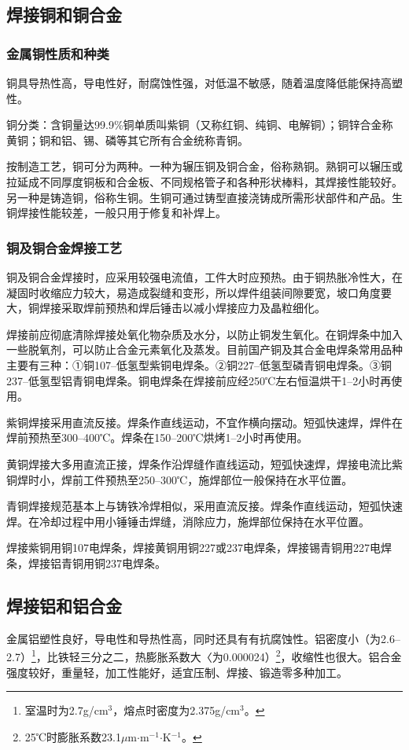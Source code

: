 \documentclass{ctexbook}
\begin{document}
\subsection{焊接铜和铜合金}
\subsubsection{金属铜性质和种类}
铜具导热性高，导电性好，耐腐蚀性强，对低温不敏感，随着温度降低能保持高塑性。

铜分类：含铜量达99.9\%铜单质叫紫铜（又称红铜、纯铜、电解铜）；铜锌合金称黄铜；铜和铝、锡、磷等其它所有合金统称青铜。

按制造工艺，铜可分为两种。一种为辗压铜及铜合金，俗称熟铜。熟铜可以辗压或拉延成不同厚度铜板和合金板、不同规格管子和各种形状棒料，其焊接性能较好。另一种是铸造铜，俗称生铜。生铜可通过铸型直接浇铸成所需形状部件和产品。生铜焊接性能较差，一般只用于修复和补焊上。
\subsubsection{铜及铜合金焊接工艺}
铜及铜合金焊接时，应采用较强电流值，工件大时应预热。由于铜热胀冷性大，在凝固时收缩应力较大，易造成裂缝和变形，所以焊件组装间隙要宽，坡口角度要大，铜焊接采取焊前预热和焊后锤击以减小焊接应力及晶粒细化。

焊接前应彻底清除焊接处氧化物杂质及水分，以防止铜发生氧化。在铜焊条中加入一些脱氧剂，可以防止合金元素氧化及蒸发。目前国产铜及其合金电焊条常用品种主要有三种：①铜107--低氢型紫铜电焊条。②铜227--低氢型磷青铜电焊条。③铜237--低氢型铝青铜电焊条。铜电焊条在焊接前应经250℃左右恒温烘干1--2小时再使用。

紫铜焊接采用直流反接。焊条作直线运动，不宜作横向摆动。短弧快速焊，焊件在焊前预热至300--400℃。焊条在150--200℃烘烤1--2小时再使用。

黄铜焊接大多用直流正接，焊条作沿焊缝作直线运动，短弧快速焊，焊接电流比紫铜焊时小，焊前工件预热至250--300℃，施焊部位一般保持在水平位置。

青铜焊接规范基本上与铸铁冷焊相似，采用直流反接。焊条作直线运动，短弧快速焊。在冷却过程中用小锤锤击焊缝，消除应力，施焊部位保持在水平位置。

焊接紫铜用铜107电焊条，焊接黄铜用铜227或237电焊条，焊接锡青铜用227电焊条，焊接铝青铜用铜237电焊条。
\subsection{焊接铝和铝合金}
金属铝塑性良好，导电性和导热性高，同时还具有有抗腐蚀性。铝密度小（为2.6--2.7）\footnote{室温时为2.7g/cm$^3$，熔点时密度为2.375g/cm$^3$。}，比铁轻三分之二，热膨胀系数大〈为0.000024）\footnote{25℃时膨胀系数23.1$\mu$m$\cdot$m$^{−1}$$\cdot$K$^{−1}$。}，收缩性也很大。铝合金强度较好，重量轻，加工性能好，适宜压制、焊接、锻造零多种加工。
\end{document}
